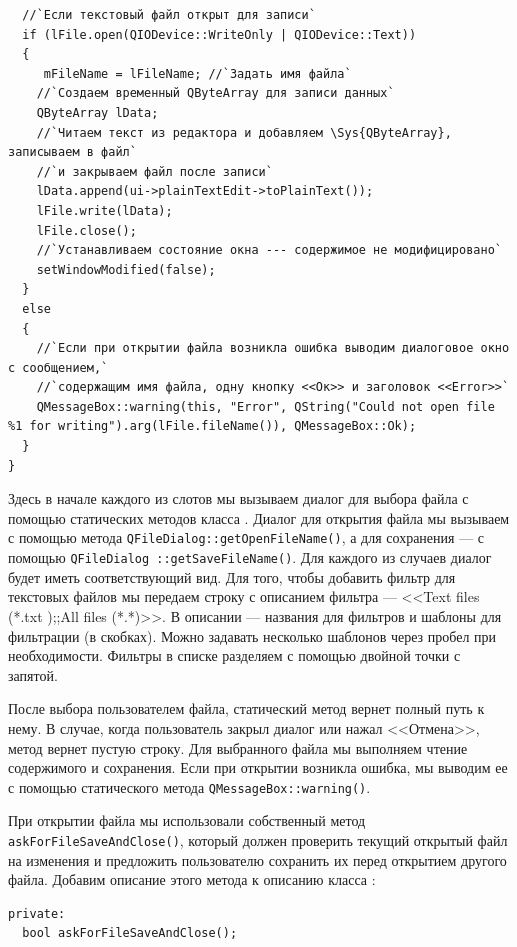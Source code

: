 \begin{lstlisting}
  //`Если текстовый файл открыт для записи`
  if (lFile.open(QIODevice::WriteOnly | QIODevice::Text))
  { 
     mFileName = lFileName; //`Задать имя файла`
    //`Создаем временный QByteArray для записи данных`
    QByteArray lData; 
    //`Читаем текст из редактора и добавляем \Sys{QByteArray}, записываем в файл`
    //`и закрываем файл после записи` 
    lData.append(ui->plainTextEdit->toPlainText());
    lFile.write(lData);
    lFile.close();
    //`Устанавливаем состояние окна --- содержимое не модифицировано`
    setWindowModified(false);
  }
  else
  {
    //`Если при открытии файла возникла ошибка выводим диалоговое окно с сообщением,`
    //`содержащим имя файла, одну кнопку <<Ок>> и заголовок <<Error>>` 
    QMessageBox::warning(this, "Error", QString("Could not open file %1 for writing").arg(lFile.fileName()), QMessageBox::Ok);
  }
}
\end{lstlisting}

Здесь в начале каждого из слотов мы вызываем диалог для выбора файла с помощью статических методов класса .
Диалог для открытия файла мы вызываем с помощью метода \lstinline!QFileDialog::getOpenFileName()!, а для сохранения --- с помощью
\lstinline!QFileDialog ::getSaveFileName()!. Для каждого из случаев диалог будет иметь соответствующий вид. Для того, чтобы
добавить фильтр для текстовых файлов мы передаем строку с описанием фильтра --- <<Text files (*.txt );;All files
(*.*)>>. В описании --- названия для фильтров и шаблоны для фильтрации (в скобках). Можно задавать несколько
шаблонов через пробел при необходимости. Фильтры в списке разделяем с помощью двойной точки с запятой. 

После выбора пользователем файла, статический метод вернет полный путь к нему. В случае, когда пользователь закрыл
диалог или нажал <<Отмена>>, метод вернет пустую строку. Для выбранного файла мы выполняем чтение
содержимого и сохранения. Если при открытии возникла ошибка, мы выводим ее с помощью статического метода
\lstinline!QMessageBox::warning()!. 

При открытии файла мы использовали собственный метод \lstinline!askForFileSaveAndClose()!, который должен проверить текущий открытый
файл на изменения и предложить пользователю сохранить их перед открытием другого файла. Добавим описание этого метода к
описанию класса : 
\begin{lstlisting}
private:
  bool askForFileSaveAndClose();
\end{lstlisting}

